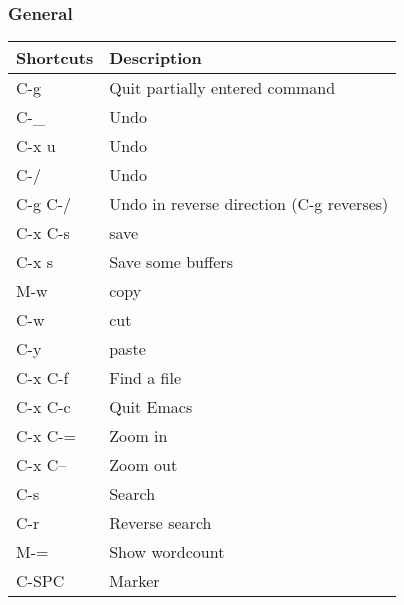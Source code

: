 \documentclass[11pt]{article}
\begin{document}
\subsubsection{General}
\label{sec:orgc5c0ce0}
\begin{center}
\begin{tabular}{ll}
\hline
Shortcuts & Description\\
\hline
C-g & Quit partially entered command\\
C-\_ & Undo\\
C-x u & Undo\\
C-/ & Undo\\
C-g C-/ & Undo in reverse direction (C-g reverses)\\
C-x C-s & save\\
C-x s & Save some buffers\\
M-w & copy\\
C-w & cut\\
C-y & paste\\
C-x C-f & Find a file\\
C-x C-c & Quit Emacs\\
C-x C-= & Zoom in\\
C-x C-- & Zoom out\\
C-s & Search\\
C-r & Reverse search\\
M-= & Show wordcount\\
C-SPC & Marker\\
\hline
\end{tabular}
\end{center}
\end{document}
